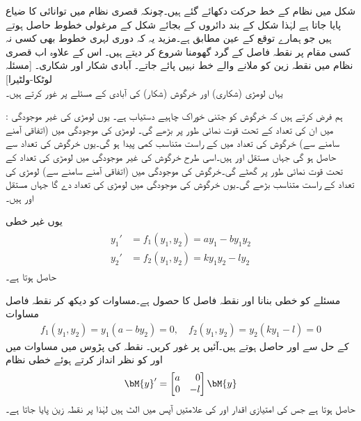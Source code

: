 شکل  میں نظام  کے خط حرکت دکھائے گئے ہیں۔چونکہ قصری نظام میں توانائی کا ضیاع پایا جاتا ہے لہٰذا شکل  کے بند دائروں کے بجائے شکل  کے مرغولی خطوط حاصل ہوتے ہیں جو ہمارے توقع کے عین مطابق ہے۔مزید یہ کہ دوری لہری خطوط بھی کسی نہ کسی مقام پر نقطہ فاصل کے گرد گھومنا شروع کر دیتے ہیں۔ اس کے علاوہ اب قصری نظام میں نقطہ زین کو ملانے والے خط نہیں پائے جاتے۔
\quad آبادی شکار اور شکاری۔ [مسئلہ لوٹکا-ولٹیرا]\\
یہاں لومڑی (شکاری) اور خرگوش (شکار) کی آبادی کے مسئلے پر غور کرتے ہیں۔

: ہم فرض کرتے ہیں کہ خرگوش کو جتنی خوراک چاہیے دستیاب ہے۔ یوں لومڑی کی غیر موجودگی میں ان کی تعداد  کے تحت قوت نمائی طور پر بڑھے گی۔ لومڑی کی موجودگی میں (اتفاقی آمنے سامنے سے)  خرگوش کی تعداد میں  کے راست متناسب کمی پیدا ہو گی۔یوں خرگوش کی تعداد  سے حاصل ہو گی جہاں مستقل  اور  ہیں۔اسی طرح خرگوش کی غیر موجودگی میں لومڑی کی تعداد  کے تحت قوت نمائی طور پر گھٹے گی۔خرگوش کی موجودگی میں (اتفاقی آمنے سامنے سے) لومڑی کی تعداد  کے راست متناسب بڑھے گی۔یوں خرگوش کی موجودگی میں   لومڑی کی تعداد دے گا جہاں مستقل  اور  ہیں۔

یوں غیر خطی  
\begin{gather}\label{مثال_نظام_شکار_شکاری_الف}
\begin{aligned}
y_1'&=f_1(y_1,y_2)=ay_1-by_1y_2\\
y_2'&=f_2(y_1,y_2)=ky_1y_2-ly_2
\end{aligned}
\end{gather}
حاصل ہوتا ہے۔

 مسئلے کو خطی بنانا اور نقطہ فاصل  کا حصول  ہے۔مساوات  کو دیکھ کر نقطہ فاصل مساوات 
\begin{align}
f_1(y_1,y_2)=y_1(a-by_2)=0, \quad f_2(y_1,y_2)=y_2(ky_1-l)=0
\end{align}
کے حل سے  اور  حاصل ہوتے ہیں۔آئیں  پر غور کریں۔ نقطہ  کی پڑوس میں مساوات  میں  اور  کو نظر انداز کرتے ہوئے خطی نظام
\begin{align*}
\bM{y}'=\begin{bmatrix*}[r] a&0\\0&-l \end{bmatrix*}\bM{y}
\end{align*}
حاصل ہوتا ہے جس کی امتیازی اقدار  اور  کی علامتیں آپس میں الٹ ہیں لہٰذا  پر نقطہ زین پایا جاتا ہے۔

